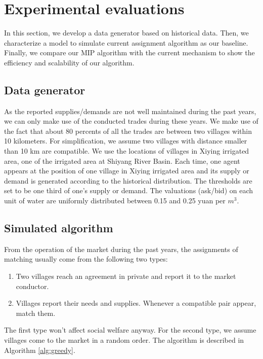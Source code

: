 \documentclass{aamas2015}
\begin{document}
\section{Experimental evaluations}

In this section, we develop a data generator based on historical data. Then, we characterize a model to simulate current assignment algorithm as our baseline. Finally, we compare our MIP algorithm with the current mechanism to show the efficiency and scalability of our algorithm.

\subsection{Data generator}

As the reported supplies/demands are not well maintained during the past years, we can only make use of the conducted trades during these years. We make use of the fact that about 80 percents of all the trades are between two villages within 10 kilometers. For simplification, we assume two villages with distance smaller than 10 km are compatible. We use the locations of villages in Xiying irrigated area, one of the irrigated area at Shiyang River Basin. Each time, one agent appears at the position of one village in Xiying irrigated area and its supply or demand is generated according to the historical distribution. The thresholds are set to be one third of one's supply or demand. The valuations (ask/bid) on each unit of water are uniformly distributed between 0.15 and 0.25 yuan per $m^3$.

\subsection{Simulated algorithm}
From the operation of the market during the past years, the assignments of matching usually come from the following two types:
\begin{enumerate}
	\item Two villages reach an agreement in private and report it to the market conductor.
	\item Villages report their needs and supplies. Whenever a compatible pair appear, match them.
\end{enumerate} 

The first type won't affect social welfare anyway. For the second type, we assume villages come to the market in a random order. The algorithm is described in Algorithm \ref{alg:greedy}.

\end{document}
